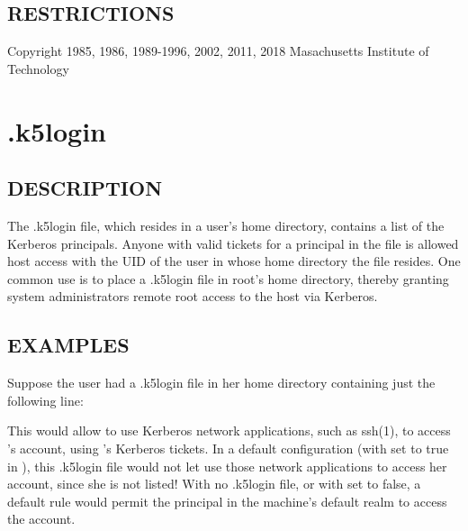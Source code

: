 \documentclass[letterpaper,10pt,english]{sphinxmanual}
\begin{document}
\subsection{RESTRICTIONS}
\label{\detokenize{user/user_config/kerberos:restrictions}}
Copyright 1985, 1986, 1989-1996, 2002, 2011, 2018 Masachusetts
Institute of Technology


\section{.k5login}
\label{\detokenize{user/user_config/k5login:k5login-5}}\label{\detokenize{user/user_config/k5login:k5login}}\label{\detokenize{user/user_config/k5login::doc}}

\subsection{DESCRIPTION}
\label{\detokenize{user/user_config/k5login:description}}
The .k5login file, which resides in a user’s home directory, contains
a list of the Kerberos principals.  Anyone with valid tickets for a
principal in the file is allowed host access with the UID of the user
in whose home directory the file resides.  One common use is to place
a .k5login file in root’s home directory, thereby granting system
administrators remote root access to the host via Kerberos.


\subsection{EXAMPLES}
\label{\detokenize{user/user_config/k5login:examples}}
Suppose the user  had a .k5login file in her home directory
containing just the following line:

%
\begin{sphinxVerbatim}[commandchars=\\\{\}]
\end{sphinxVerbatim}

This would allow  to use Kerberos network applications, such as
ssh(1), to access ’s account, using ’s Kerberos
tickets.  In a default configuration (with  set
to true in ), this .k5login file would not let
 use those network applications to access her account, since
she is not listed!  With no .k5login file, or with 
set to false, a default rule would permit the principal  in the
machine’s default realm to access the  account.
\end{document}
